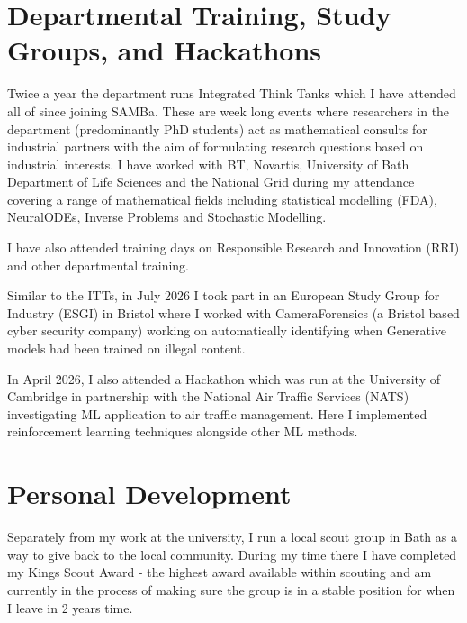 \documentclass[11pt, onecolumn]{report}
\begin{document}
\section{Departmental Training, Study Groups, and Hackathons}
Twice a year the department runs Integrated Think Tanks which I have attended all of since joining SAMBa. These are week long events where researchers in the department (predominantly PhD students) act as mathematical consults for industrial partners with the aim of formulating research questions based on industrial interests. I have worked with BT, Novartis, University of Bath Department of Life Sciences and the National Grid during my attendance covering a range of mathematical fields including statistical modelling (FDA), NeuralODEs, Inverse Problems and Stochastic Modelling.

I have also attended training days on Responsible Research and Innovation (RRI) and other departmental training. 

Similar to the ITTs, in July 2026 I took part in an European Study Group for Industry (ESGI) in Bristol where I worked with CameraForensics (a Bristol based cyber security company) working on automatically identifying when Generative models had been trained on illegal content. 

In April 2026, I also attended a Hackathon which was run at the University of Cambridge in partnership with the National Air Traffic Services (NATS) investigating ML application to air traffic management. Here I implemented reinforcement learning techniques alongside other ML methods.

\section{Personal Development}
Separately from my work at the university, I run a local scout group in Bath as a way to give back to the local community. During my time there I have completed my Kings Scout Award - the highest award available within scouting and am currently in the process of making sure the group is in a stable position for when I leave in 2 years time.
\end{document}
